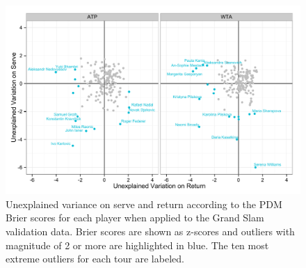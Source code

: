 \documentclass{Latex/svjour3}
\begin{document}
\begin{figure}
\includegraphics[scale=0.9]{figs/player_volatility.pdf}
\caption{Unexplained variance on serve and return according to the PDM
Brier scores for each player when applied to the Grand Slam validation
data. Brier scores are shown as z-scores and outliers with magnitude
of 2 or more are highlighted in blue. The ten most extreme outliers
for each tour are labeled.}
\label{fig:volatility}
\end{figure}
\end{document}
